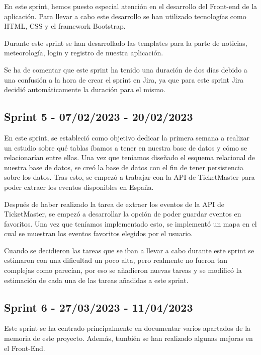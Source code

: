 En este sprint, hemos puesto especial atención en el desarrollo del Front-end de la aplicación. Para llevar a cabo este desarrollo se han utilizado tecnologías como HTML, CSS y el framework Bootstrap.

Durante este sprint se han desarrollado las templates para la parte de noticias, meteorología, login y registro de nuestra aplicación.

Se ha de comentar que este sprint ha tenido una duración de dos días debido a una confusión a la hora de crear el sprint en Jira, ya que para este sprint Jira decidió automáticamente la duración para el mismo.


\subsection{Sprint 5 - 07/02/2023 - 20/02/2023}

En este sprint, se estableció como objetivo dedicar la 
 primera semana a realizar un estudio sobre qué tablas íbamos a tener en nuestra base de datos y cómo se relacionarían entre ellas. Una vez que teníamos diseñado el esquema relacional de nuestra base de datos,  se creó la base de datos con el fin de tener persistencia sobre los datos. Tras esto, se empezó a trabajar con la API de TicketMaster para poder extraer los eventos disponibles en España.

Después de haber realizado la tarea de extraer los eventos de la API de TicketMaster, se empezó a desarrollar la opción de poder guardar eventos en favoritos. Una vez que teníamos implementado esto, se implementó un mapa en el cual se muestran los eventos favoritos elegidos por el usuario.

Cuando se decidieron las tareas que se iban a llevar a cabo durante este sprint se estimaron con una dificultad un poco alta, pero realmente no fueron tan complejas como parecían, por eso se añadieron nuevas tareas y se modificó la estimación de cada una de las tareas añadidas a este sprint.


\subsection{Sprint 6 - 27/03/2023 - 11/04/2023}

Este sprint se ha centrado principalmente en documentar varios apartados de la memoria de este proyecto. Además, también se han realizado algunas mejoras en el Front-End.

